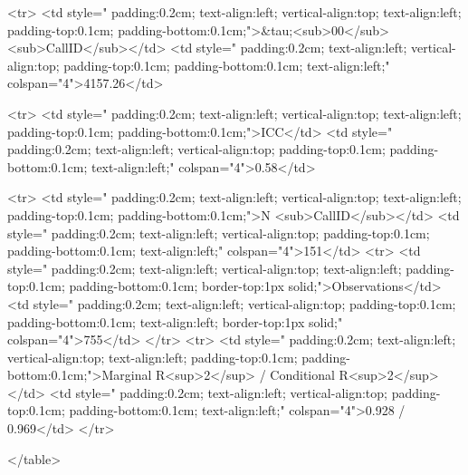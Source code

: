 <tr>
<td style=" padding:0.2cm; text-align:left; vertical-align:top; text-align:left; padding-top:0.1cm; padding-bottom:0.1cm;">&tau;<sub>00</sub> <sub>CallID</sub></td>
<td style=" padding:0.2cm; text-align:left; vertical-align:top; padding-top:0.1cm; padding-bottom:0.1cm; text-align:left;" colspan="4">4157.26</td>

<tr>
<td style=" padding:0.2cm; text-align:left; vertical-align:top; text-align:left; padding-top:0.1cm; padding-bottom:0.1cm;">ICC</td>
<td style=" padding:0.2cm; text-align:left; vertical-align:top; padding-top:0.1cm; padding-bottom:0.1cm; text-align:left;" colspan="4">0.58</td>

<tr>
<td style=" padding:0.2cm; text-align:left; vertical-align:top; text-align:left; padding-top:0.1cm; padding-bottom:0.1cm;">N <sub>CallID</sub></td>
<td style=" padding:0.2cm; text-align:left; vertical-align:top; padding-top:0.1cm; padding-bottom:0.1cm; text-align:left;" colspan="4">151</td>
<tr>
<td style=" padding:0.2cm; text-align:left; vertical-align:top; text-align:left; padding-top:0.1cm; padding-bottom:0.1cm; border-top:1px solid;">Observations</td>
<td style=" padding:0.2cm; text-align:left; vertical-align:top; padding-top:0.1cm; padding-bottom:0.1cm; text-align:left; border-top:1px solid;" colspan="4">755</td>
</tr>
<tr>
<td style=" padding:0.2cm; text-align:left; vertical-align:top; text-align:left; padding-top:0.1cm; padding-bottom:0.1cm;">Marginal R<sup>2</sup> / Conditional R<sup>2</sup></td>
<td style=" padding:0.2cm; text-align:left; vertical-align:top; padding-top:0.1cm; padding-bottom:0.1cm; text-align:left;" colspan="4">0.928 / 0.969</td>
</tr>

</table>

